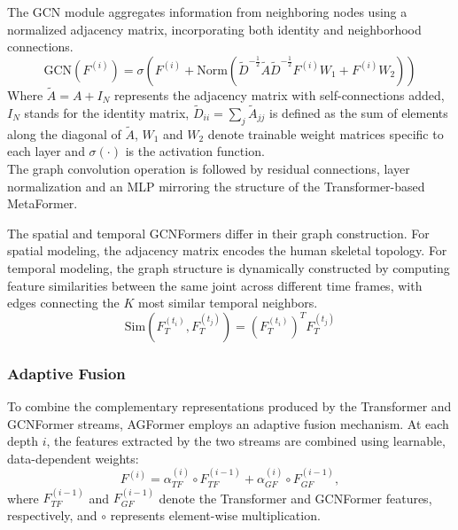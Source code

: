 The GCN module \cite{luo2022learning} aggregates information from neighboring nodes using a normalized adjacency matrix, incorporating both identity and neighborhood connections.
\begin{equation} 
    \text{GCN}(F^{(i)}) = \sigma ( F^{(i)} + \text{Norm}(\tilde{D}^{-\frac{1}{2}} \tilde{A} \tilde{D}^{-\frac{1}{2}} F^{(i)} W_1 + F^{(i)} W_2) ) 
\end{equation} 
Where $\tilde{A} = A + I_N$ represents the adjacency matrix with self-connections added, $I_N$ stands for the identity matrix, $\tilde{D}_{ii} = \sum_j \tilde{A}_{jj}$ 
is defined as the sum of elements along the diagonal of $\tilde{A}$, $W_1$ and $W_2$ denote trainable weight matrices specific to each layer and $\sigma(\cdot)$ is
the activation function.\\
The graph convolution operation is followed by residual connections, layer normalization and an MLP mirroring the structure of the Transformer-based MetaFormer.

The spatial and temporal GCNFormers differ in their graph construction.
For spatial modeling, the adjacency matrix encodes the human skeletal topology.
For temporal modeling, the graph structure is dynamically constructed by computing feature similarities between the same joint across different time frames, with edges connecting the \( K \) most similar temporal neighbors.
\begin{equation}
    \text{Sim}(F_{T}^{(t_i)}, F_{T}^{(t_j)}) = (F_{T}^{(t_i)})^T F_{T}^{(t_j)}
\end{equation}


\subsubsection{Adaptive Fusion}
To combine the complementary representations produced by the Transformer and GCNFormer streams, AGFormer employs an adaptive fusion mechanism.
At each depth \( i \), the features extracted by the two streams are combined using learnable, data-dependent weights:
\begin{equation}
    F^{(i)} = \alpha_{TF}^{(i)} \circ F_{TF}^{(i-1)} + \alpha_{GF}^{(i)} \circ F_{GF}^{(i-1)},
\end{equation}
where \( F_{TF}^{(i-1)} \) and \( F_{GF}^{(i-1)} \) denote the Transformer and GCNFormer features, respectively, and \( \circ \) represents element-wise multiplication.

